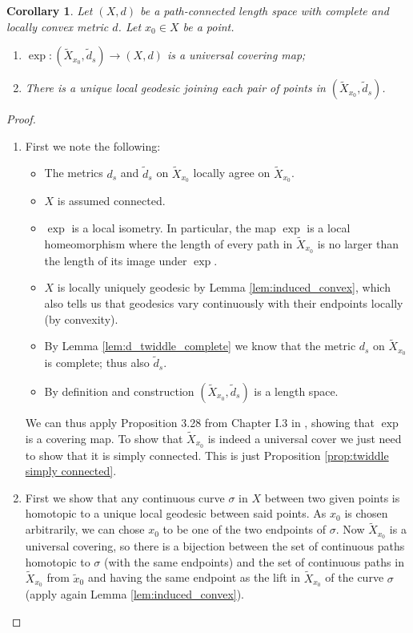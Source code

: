 \documentclass[11pt, a4paper, oneside]{memoir}
\theoremstyle{plain}\newtheorem{theorem}[subsection]{Theorem}
\newtheorem{corollary}[subsection]{Corollary}
\theoremstyle{definition}
\newcommand{\parenum}{\setenumerate[1]{label=\textbf{(\arabic*)}}}
\newcommand{\twiddle}[1]{\widetilde{#1}}
\begin{document}
\begin{corollary}\label{cor:unique_geo}
    Let \((X,d)\) be a path-connected length space with complete and locally convex metric \(d\). Let \(x_0\in X\) be a point.
\parenum
\begin{enumerate}
    \item \(\exp:(\twiddle{X}_{x_0},\twiddle{d}_s )\to (X,d)\) is a universal covering map;
    \item There is a unique local geodesic joining each pair of points in \(\left(\twiddle{X}_{x_0},\twiddle{d}_s\right)\).
\end{enumerate}
\end{corollary}
\begin{proof}
\parenum
\begin{enumerate}
    \item First we note the following:
\begin{itemize}
    \item  The metrics $d_s$ and $\twiddle{d}_s$ on $\twiddle{X}_{x_0}$ locally agree on $\twiddle{X}_{x_0}$.
    \item \(X\) is assumed connected.
    \item $\exp$ is a local isometry.
    In particular, the map $\exp$ is a local homeomorphism where the length of every path in \(\twiddle{X}_{x_0}\) is no larger than the length of its image under $\exp$.
    \item \(X\) is locally uniquely geodesic by Lemma \ref{lem:induced_convex}, which also tells us that geodesics vary continuously with their endpoints locally (by convexity). 
    \item By Lemma \ref{lem:d_twiddle_complete} we know that the metric \(d_s\) on \(\twiddle{X}_{x_0}\) is complete; thus also $\twiddle{d}_s$.
    \item  By definition and construction  $(\twiddle{X}_{x_0},\twiddle{d}_s)$ is a length space. 
\end{itemize}
We can thus apply Proposition 3.28 from Chapter I.3 in \cite{BridHaef}, showing that $\exp$ is a covering map.
To show that \(\twiddle{X}_{x_0}\) is indeed a universal cover we just need to show that it is simply connected.
This is just Proposition \ref{prop:twiddle simply connected}.
    \item First we show that any continuous curve \(\sigma\) in \(X\) between two given points is homotopic to a unique local geodesic between said points.
As \(x_0\) is chosen arbitrarily, we can chose $x_0$ to be one of the two endpoints of \(\sigma\).
Now \(\twiddle{X}_{x_0}\) is a universal covering, so there is a bijection between the set of continuous paths homotopic to \(\sigma\) (with the same endpoints) and the set of continuous paths in \(\twiddle{X}_{x_0}\) from \(\twiddle{x}_0\) and having the same endpoint as the lift in $\twiddle{X}_{x_0}$ of the curve \(\sigma\) (apply again Lemma \ref{lem:induced_convex}).

\end{enumerate}
\end{proof}
\end{document}
